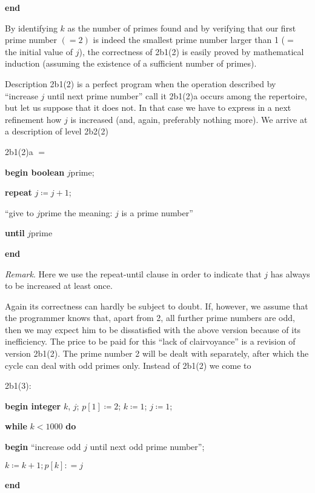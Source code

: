 \noindent
\textbf{end}

By identifying $k$ as the number of primes found and by verifying that our first prime number $(=2)$ is indeed the smallest prime number larger than 1 ($=$ the initial value of $j$), the correctness of 2b1(2) is easily proved by mathematical induction (assuming the existence of a sufficient number of primes).

Description 2b1(2) is a perfect program when the operation described by ``increase $j$ until next prime number'' \textemdash{}  call it 2b1(2)a \textemdash{}  occurs among the repertoire, but let us suppose that it does not. In that case we have to express in a next refinement how $j$ is increased (and, again, preferably nothing more). We arrive at a description of level 2b2(2)

\noindent
2b1(2)a $=$

\noindent
\textbf{begin boolean} $j$prime;

\noindent
\quad \textbf{repeat} $j \coloneq j + 1$;

\noindent
\quad\quad  ``give to $j$prime the meaning: $j$ is a prime number''

\noindent
\quad \textbf{until} $j$prime

\noindent
\textbf{end}

\noindent
\textit{Remark}. Here we use the repeat-until clause in order to indicate that $j$ has always to be increased at least once.

Again its correctness can hardly be subject to doubt. If, however, we assume that the programmer knows that, apart from 2, all further prime numbers are odd, then we may expect him to be dissatisfied with the above version because of its inefficiency. The price to be paid for this ``lack of clairvoyance'' is a revision of version 2b1(2). The prime number 2 will be dealt with separately, after which the cycle can deal with odd primes only. Instead of 2b1(2) we come to

\noindent
2b1(3):

\noindent
\textbf{begin integer} $k$, $j$; $p[1] \coloneq 2$; $k \coloneq 1$; $j \coloneq 1$;

\noindent
\quad\textbf{while} $k < 1000$ \textbf{do}

\noindent
\quad\quad\textbf{begin} ``increase odd $j$ until next odd prime number'';

\noindent
\quad\quad\quad $k \coloneq k + 1; p[k]: = j$

\noindent
\quad\quad\textbf{end}

